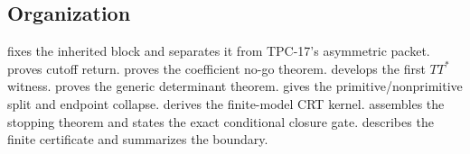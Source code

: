 \subsection{Organization}

 fixes the inherited block and separates it from
TPC-17's asymmetric packet.   proves cutoff return.
 proves the coefficient no-go theorem.
 develops the first $TT^*$ witness.
 proves the generic determinant theorem.
 gives the primitive/nonprimitive split and endpoint
collapse.   derives the finite-model CRT kernel.
 assembles the stopping theorem and states the exact
conditional closure gate.   describes the finite
certificate and summarizes the boundary.
